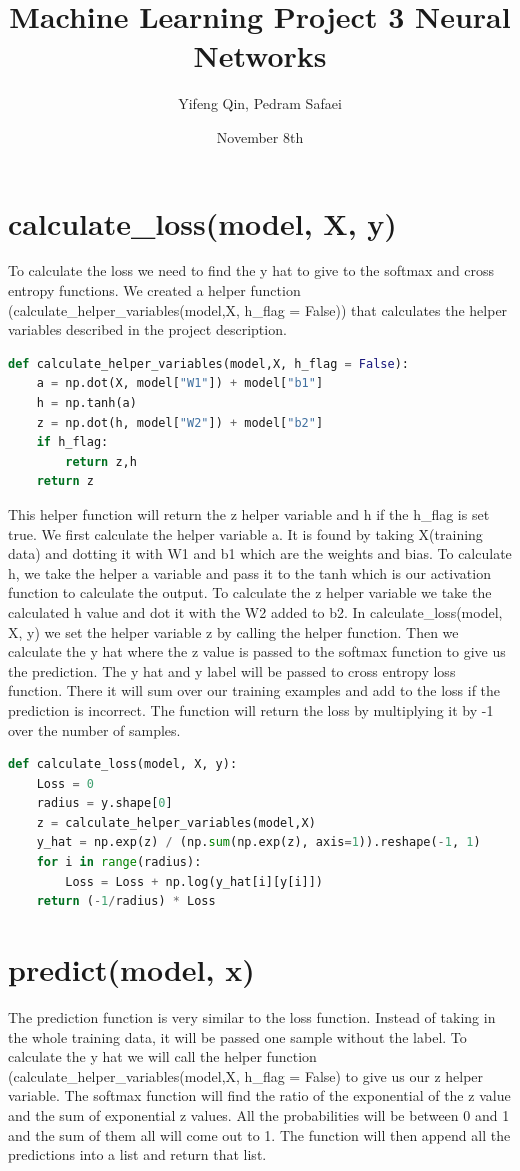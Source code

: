 \documentclass{article}
\title{Machine Learning Project 3 Neural Networks}
\author{Yifeng Qin, Pedram Safaei}
\date{November 8th}
\begin{document}
\maketitle

\section{calculate\_loss(model, X, y)}
To calculate the loss we need to find the y hat to give to the softmax and cross entropy functions. We created a helper function (calculate\_helper\_variables(model,X, h\_flag = False)) that calculates the helper variables described in the project description. \newline 
\begin{lstlisting}[language=Python]
	def calculate_helper_variables(model,X, h_flag = False):
    a = np.dot(X, model["W1"]) + model["b1"]
    h = np.tanh(a)
    z = np.dot(h, model["W2"]) + model["b2"]
    if h_flag:
        return z,h
    return z
	\end{lstlisting}
	
This helper function will return the z helper variable and h if the h\_flag is set true. We first calculate the helper variable a. It is found by taking X(training data) and dotting it with W1 and b1 which are the weights and bias. To calculate h, we take the helper a variable and pass it to the tanh which is our activation function to calculate the output. To calculate the z helper variable we take the calculated h value and dot it with the W2 added to b2. In calculate\_loss(model, X, y) we set the helper variable z by calling the helper function. Then we calculate the y hat where the z value is passed to the softmax function to give us the prediction. The y hat and y label will be passed to cross entropy loss function. There it will sum over our training examples and add to the loss if the prediction is incorrect. The function will return the loss by multiplying it by -1 over the number of samples.

\begin{lstlisting}[language=Python]
	def calculate_loss(model, X, y):
    Loss = 0
    radius = y.shape[0]
    z = calculate_helper_variables(model,X)
    y_hat = np.exp(z) / (np.sum(np.exp(z), axis=1)).reshape(-1, 1)
    for i in range(radius):
        Loss = Loss + np.log(y_hat[i][y[i]])
    return (-1/radius) * Loss
	\end{lstlisting}

\section{predict(model, x)}
The prediction function is very similar to the loss function. Instead of taking in the whole training data, it will be passed one sample without the label. To calculate the y hat we will call the helper function (calculate\_helper\_variables(model,X, h\_flag = False) to give us our z helper variable. The softmax function will find the ratio of the exponential of the z value and the sum of exponential z values. All the probabilities will be between 0 and 1 and the sum of them all will come out to 1. The function will then append all the predictions into a list and return that list. 
\end{document}
